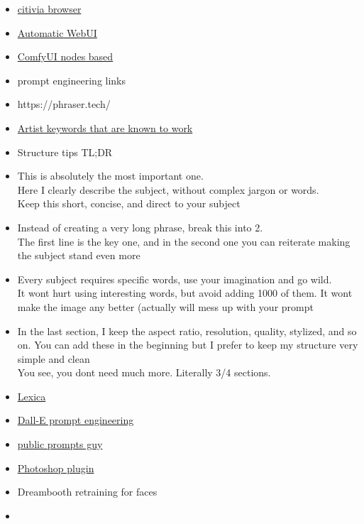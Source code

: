 \begin{itemize}
{  GUI and user guide}
\item
  \href{https://github.com/Vetchems/sd-civitai-browser}{citivia browser}
\item
  \href{https://github.com/AUTOMATIC1111/stable-diffusion-webui}{Automatic
  WebUI}
\item
  \href{https://github.com/comfyanonymous/ComfyUI}{ComfyUI nodes based}
\item
  prompt engineering links
\item
  https://phraser.tech/
\item
  \href{https://docs.google.com/document/d/1SaQx1uJ9LBRS7c6OsZIaeanJGkUdsUBjk9X4dC59BaA/edit\#}{Artist
  keywords that are known to work}
\item
  Structure tips TL;DR
\item
  This is absolutely the most important one.\\
  Here I clearly describe the subject, without complex jargon or
  words.\\
  Keep this short, concise, and direct to your subject
\item
  Instead of creating a very long phrase, break this into 2.\\
  The first line is the key one, and in the second one you can reiterate
  making the subject stand even more
\item
  Every subject requires specific words, use your imagination and go
  wild.\\
  It won\textquotesingle t hurt using interesting words, but avoid
  adding 1000 of them. It won\textquotesingle t make the image any
  better (actually will mess up with your prompt
\item
  In the last section, I keep the aspect ratio, resolution, quality,
  stylized, and so on. You can add these in the beginning but I prefer
  to keep my structure very simple and clean\\
  You see, you don\textquotesingle t need much more. Literally 3/4
  sections.
\item
  \href{https://lexica.art/}{Lexica}
\item
  \href{https://docs.google.com/document/d/11WlzjBT0xRpQhP9tFMtxzd0q6ANIdHPUBkMV-YB043U/edit\#}{Dall-E
  prompt engineering}
\item
  \href{https://publicprompts.art/}{public prompts guy}
\item
  \href{https://christiancantrell.com/\#ai-ml}{Photoshop plugin}
\item
  Dreambooth retraining for faces
\item

\end{itemize}
